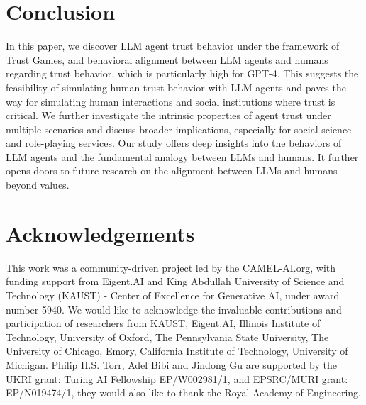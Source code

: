 















\vspace{-2.5mm}
\section{Conclusion}
\vspace{-2mm}
In this paper, we discover LLM agent trust behavior under the framework of Trust Games, and behavioral alignment between LLM agents and humans regarding trust behavior, which is  particularly high for GPT-4. This suggests the feasibility of simulating human trust behavior with LLM agents  and paves the way for simulating human interactions and social institutions where trust is critical. We further investigate the intrinsic properties of agent trust under multiple scenarios and discuss broader implications, especially for social science and role-playing services.
Our study offers deep insights into the behaviors of LLM agents and the fundamental analogy between LLMs and humans. It further opens doors to future research on the alignment between LLMs and humans beyond values. 




\clearpage
\newpage

\section*{Acknowledgements}
This work was a community-driven project led by the CAMEL-AI.org, with funding support from Eigent.AI and King Abdullah University of Science and Technology (KAUST) - Center of Excellence for Generative AI, under award number 5940. We would like to acknowledge the invaluable contributions and participation of researchers from KAUST, Eigent.AI, Illinois Institute of Technology, University of Oxford, The Pennsylvania State University, The University of Chicago, Emory, California Institute of Technology, University of Michigan. Philip H.S. Torr, Adel Bibi and Jindong Gu are supported by the UKRI grant: Turing AI Fellowship EP/W002981/1, and EPSRC/MURI grant: EP/N019474/1, they would also like to thank the Royal Academy of Engineering.






